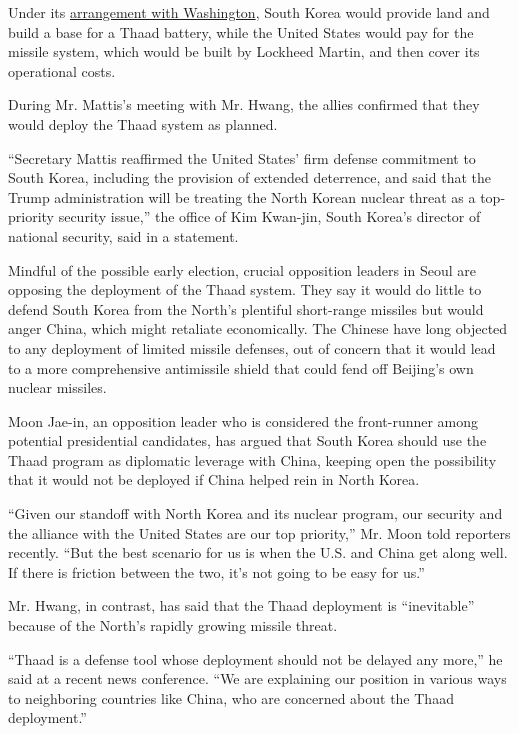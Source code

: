 Under its
\href{https://www.nytimes.com/2016/07/14/world/asia/south-korea-thaad-us.html}{arrangement
with Washington}, South Korea would provide land and build a base for a
Thaad battery, while the United States would pay for the missile system,
which would be built by Lockheed Martin, and then cover its operational
costs.

During Mr. Mattis's meeting with Mr. Hwang, the allies confirmed that
they would deploy the Thaad system as planned.

``Secretary Mattis reaffirmed the United States' firm defense commitment
to South Korea, including the provision of extended deterrence, and said
that the Trump administration will be treating the North Korean nuclear
threat as a top-priority security issue,'' the office of Kim Kwan-jin,
South Korea's director of national security, said in a statement.

Mindful of the possible early election, crucial opposition leaders in
Seoul are opposing the deployment of the Thaad system. They say it would
do little to defend South Korea from the North's plentiful short-range
missiles but would anger China, which might retaliate economically. The
Chinese have long objected to any deployment of limited missile
defenses, out of concern that it would lead to a more comprehensive
antimissile shield that could fend off Beijing's own nuclear missiles.

Moon Jae-in, an opposition leader who is considered the front-runner
among potential presidential candidates, has argued that South Korea
should use the Thaad program as diplomatic leverage with China, keeping
open the possibility that it would not be deployed if China helped rein
in North Korea.

``Given our standoff with North Korea and its nuclear program, our
security and the alliance with the United States are our top priority,''
Mr. Moon told reporters recently. ``But the best scenario for us is when
the U.S. and China get along well. If there is friction between the two,
it's not going to be easy for us.''

Mr. Hwang, in contrast, has said that the Thaad deployment is
``inevitable'' because of the North's rapidly growing missile threat.

``Thaad is a defense tool whose deployment should not be delayed any
more,'' he said at a recent news conference. ``We are explaining our
position in various ways to neighboring countries like China, who are
concerned about the Thaad deployment.''

